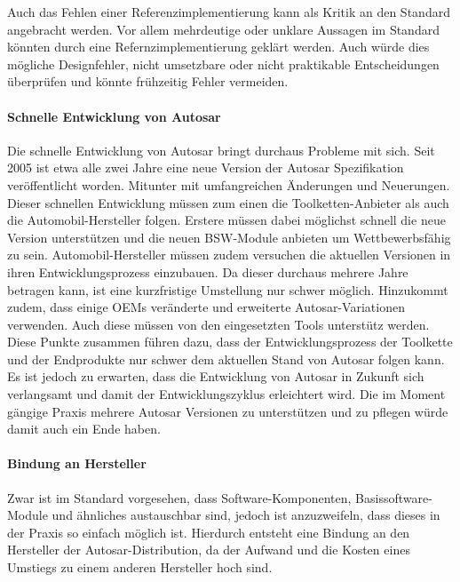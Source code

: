 \documentclass[
  a4paper,					    %
  twoside,
  DIV=calc,     				%
  bibliography=totoc,
  cleardoublepage=empty,
  ngerman,     					%
  final       					%
]{scrbook}
\begin{document}
Auch das Fehlen einer Referenzimplementierung kann als Kritik an den Standard angebracht werden.\cite{Hoffmann200803} Vor allem mehrdeutige oder unklare Aussagen im Standard könnten durch eine Refernzimplementierung geklärt werden. Auch würde dies mögliche Designfehler, nicht umsetzbare oder nicht praktikable Entscheidungen überprüfen und könnte frühzeitig Fehler vermeiden. 


\paragraph{Schnelle Entwicklung von Autosar}
Die schnelle Entwicklung von Autosar bringt durchaus Probleme mit sich. Seit 2005 ist etwa alle zwei Jahre eine neue Version der Autosar Spezifikation veröffentlicht worden. Mitunter mit umfangreichen Änderungen und Neuerungen. Dieser schnellen Entwicklung müssen zum einen die Toolketten-Anbieter als auch die Automobil-Hersteller folgen. Erstere müssen dabei möglichst schnell die neue Version unterstützen und die neuen BSW-Module anbieten um Wettbewerbsfähig zu sein. Automobil-Hersteller müssen zudem versuchen die aktuellen Versionen in ihren Entwicklungsprozess einzubauen. Da dieser durchaus mehrere Jahre betragen kann, ist eine kurzfristige Umstellung nur schwer möglich. Hinzukommt zudem, dass einige OEMs veränderte und erweiterte Autosar-Variationen verwenden. Auch diese müssen von den eingesetzten Tools unterstütz werden. Diese Punkte zusammen führen dazu, dass der Entwicklungsprozess der Toolkette und der Endprodukte nur schwer dem aktuellen Stand von Autosar folgen kann. Es ist jedoch zu erwarten, dass die Entwicklung von Autosar in Zukunft sich verlangsamt und damit der Entwicklungszyklus erleichtert wird. Die im Moment gängige Praxis mehrere Autosar Versionen zu unterstützen und zu pflegen würde damit auch ein Ende haben.\cite[Seite 179]{SE_Autosar}\cite{as_kritik}

\paragraph{Bindung an Hersteller}
Zwar ist im Standard vorgesehen, dass Software-Komponenten, Basissoftware-Module und ähnliches austauschbar sind, jedoch ist anzuzweifeln, dass dieses in der Praxis so einfach möglich ist. Hierdurch entsteht eine Bindung an den Hersteller der Autosar-Distribution, da der Aufwand und die Kosten eines Umstiegs zu einem anderen Hersteller hoch sind.\cite{as_kritik}
\end{document}
